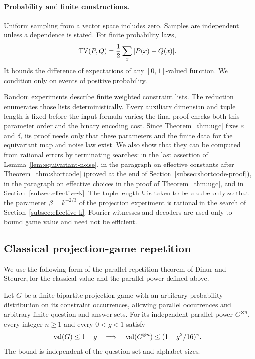 \paragraph{Probability and finite constructions.}
Uniform sampling from a vector space includes zero. Samples are
independent unless a dependence is stated. For finite probability laws,
\[
 \operatorname{TV}(P,Q)=\frac12\sum_x|P(x)-Q(x)|.
\]
It bounds the difference of expectations of any \([0,1]\)-valued
function. We condition only on events of positive probability.

Random experiments describe finite weighted constraint lists.
The reduction enumerates those lists deterministically. Every auxiliary
dimension and tuple length is fixed before the input formula varies;
the final proof checks both this parameter order and the binary
encoding cost. Since Theorem~\ref{thm:ugc} fixes \(\varepsilon\) and
\(\delta\), its proof needs only that these parameters and the finite
data for the equivariant map and noise law exist. We also show that they can be computed from rational
errors by terminating searches: in the last assertion of
Lemma~\ref{lem:equivariant-noise}, in the paragraph on effective constants after
Theorem~\ref{thm:shortcode} (proved at the end of
Section~\ref{subsec:shortcode-proof}), in the paragraph on effective
choices in the proof of Theorem~\ref{thm:ugc}, and in
Section~\ref{subsec:effective-k}. The tuple length \(k\) is taken to be a cube only so that the
parameter \(\beta=k^{-2/3}\) of the projection experiment is rational in
the search of Section~\ref{subsec:effective-k}.
Fourier witnesses and decoders are used only to bound
game value and need not be efficient.

\subsection{Classical projection-game repetition}

We use the following form of the parallel repetition theorem of
Dinur and Steurer, for the classical value and the parallel power
defined above.

\begin{theorem}
\label{thm:repetition}
Let $G$ be a finite bipartite projection game with an arbitrary
probability distribution on its constraint occurrences, allowing parallel
occurrences and arbitrary finite question and answer sets.  For its
independent parallel power $G^{\otimes n}$, every integer $n\ge1$
and every $0<g<1$ satisfy
\begin{equation}
 \operatorname{val}(G)\le 1-g
 \quad\Longrightarrow\quad
 \operatorname{val}(G^{\otimes n})\le (1-g^2/16)^n.
 \label{eq:projection-repetition}
\end{equation}
The bound is independent of the question-set and alphabet sizes.
\end{theorem}

